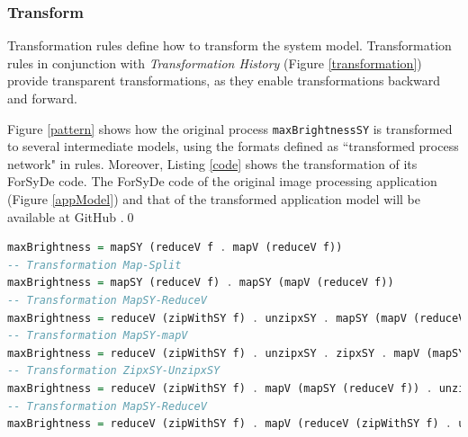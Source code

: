 \subsubsection{Transform}
Transformation rules define how to transform the system model. Transformation rules in conjunction with \textit{Transformation History} (Figure \ref{transformation}) provide  transparent transformations, as they enable transformations backward and forward. 
\begin{exmp}
Figure \ref{pattern} shows how the original process \texttt{maxBrightnessSY} is transformed to several intermediate models, using the formats defined as ``transformed process network" in rules. Moreover, Listing \ref{code} shows the transformation of its ForSyDe code. The ForSyDe code of the original image processing application (Figure \ref{appModel}) and that of the transformed application model will be available at GitHub \cite{omitted}.\qed
\begin{lstlisting}[float,floatplacement=H, language=Haskell, label={code}, caption= The transformation of process maxBrightnessSY.]
maxBrightness = mapSY (reduceV f . mapV (reduceV f))
-- Transformation Map-Split
maxBrightness = mapSY (reduceV f) . mapSY (mapV (reduceV f))
-- Transformation MapSY-ReduceV
maxBrightness = reduceV (zipWithSY f) . unzipxSY . mapSY (mapV (reduceV f))
-- Transformation MapSY-mapV
maxBrightness = reduceV (zipWithSY f) . unzipxSY . zipxSY . mapV (mapSY (reduceV f)) . unzipxSY
-- Transformation ZipxSY-UnzipxSY
maxBrightness = reduceV (zipWithSY f) . mapV (mapSY (reduceV f)) . unzipxSY
-- Transformation MapSY-ReduceV
maxBrightness = reduceV (zipWithSY f) . mapV (reduceV (zipWithSY f) . unzipxSY) . unzipxSY
\end{lstlisting}
\end{exmp}
